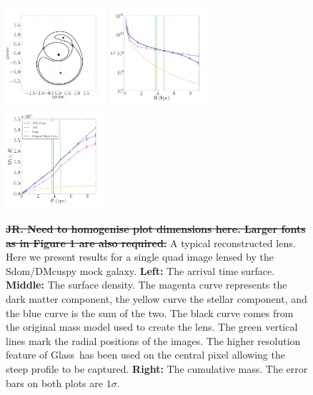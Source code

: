 \documentclass[galley,usenatbib]{mn2e}
\newcommand{\Glass}{{\sc Glass}}
\begin{document}
\begin{figure}
\includegraphics[width=0.33\textwidth]{BCQuadR1a_TmS-a.pdf}
\includegraphics[width=0.33\textwidth]{BCQuadR1a_TmS-b.pdf}
\includegraphics[width=0.33\textwidth]{BCQuadR1a_TmS-c.pdf}
\caption{
  \sout{{\bf JR. Need to homogenise plot dimensions here. Larger fonts as in Figure 1 are also required.} }
A typical reconstructed lens. Here we present results for a single quad image lensed by the Sdom/DMcuspy mock galaxy.
\textbf{Left:}
The arrival time surface. 
\textbf{Middle:}
The surface density. The magenta curve represents the dark matter component,
the yellow curve the stellar component, and the blue curve is the sum of the two.
The black curve comes from the original mass model used to create the lens.
The green vertical lines mark the radial positions of the images. The higher
resolution feature of \Glass\ has been used on the central pixel allowing the
steep profile to be captured.
\textbf{Right:}
The cumulative mass. The error bars on both plots are $1\sigma$.}
\label{reconstruction}
\end{figure}
\end{document}
